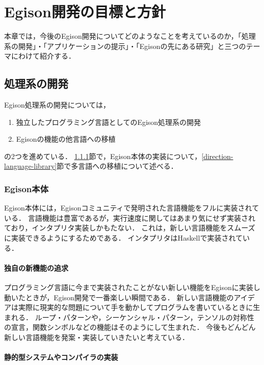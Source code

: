 \chapter{Egison開発の目標と方針}\label{direction}

本章では，今後のEgison開発についてどのようなことを考えているのか，「処理系の開発」・「アプリケーションの提示」・「Egisonの先にある研究」と三つのテーマにわけて紹介する．

\section{処理系の開発}\label{direction-language}

Egison処理系の開発については，
\begin{enumerate}
\item 独立したプログラミング言語としてのEgison処理系の開発
\item Egisonの機能の他言語への移植
\end{enumerate}
の2つを進めている．
\ref{direction-language-egison}節で，Egison本体の実装について，\ref{direction-language-library}節で多言語への移植について述べる．

\subsection{Egison本体}\label{direction-language-egison}

Egison本体には，Egisonコミュニティで発明された言語機能をフルに実装されている．
言語機能は豊富であるが，実行速度に関してはあまり気にせず実装されており，インタプリタ実装しかもたない．
これは，新しい言語機能をスムーズに実装できるようにするためである．
インタプリタはHaskellで実装されている．

\subsubsection{独自の新機能の追求}\label{direction-language-egison-new}

プログラミング言語に今まで実装されたことがない新しい機能をEgisonに実装し動いたときが，Egison開発で一番楽しい瞬間である．
新しい言語機能のアイデアは実際に現実的な問題について手を動かしてプログラムを書いているときに生まれる．
ループ・パターンや，シーケンシャル・パターン，テンソルの対称性の宣言，関数シンボルなどの機能はそのようにして生まれた．
今後もどんどん新しい言語機能を発案・実装していきたいと考えている．

\subsubsection{静的型システムやコンパイラの実装}\label{direction-language-egison-existing}

